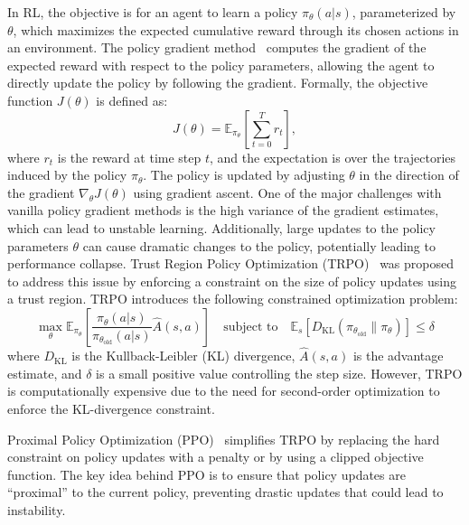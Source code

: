 In RL, the objective is for an agent to learn a policy $\pi_\theta(a|s)$, parameterized by $\theta$, which maximizes the expected cumulative reward through its chosen actions in an environment. The policy gradient method~\cite{sutton1999policy} computes the gradient of the expected reward with respect to the policy parameters, allowing the agent to directly update the policy by following the gradient. Formally, the objective function $J(\theta)$ is defined as:
%
\[
J(\theta) = \mathbb{E}_{\pi_\theta} \left[ \sum_{t=0}^{T} r_t \right],
\]
%
where $r_t$ is the reward at time step $t$, and the expectation is over the trajectories induced by the policy $\pi_\theta$. The policy is updated by adjusting $\theta$ in the direction of the gradient $\nabla_\theta J(\theta)$ using gradient ascent. One of the major challenges with vanilla policy gradient methods is the high variance of the gradient estimates, which can lead to unstable learning. Additionally, large updates to the policy parameters $\theta$ can cause dramatic changes to the policy, potentially leading to performance collapse. 
%
Trust Region Policy Optimization (TRPO)~\cite{schulman2015trpo} was proposed to address this issue by enforcing a constraint on the size of policy updates using a trust region.
%
TRPO introduces the following constrained optimization problem:
%
{\small
\[
 \max_\theta \mathbb{E}_{\pi_\theta} \left[ \frac{\pi_\theta(a|s)}{\pi_{\theta_\text{old}}(a|s)} \hat{A}(s,a) \right] 
 \quad \mbox{subject to} \quad \mathbb{E}_{s} \left[ D_{\text{KL}} \left( \pi_{\theta_\text{old}} \| \pi_\theta \right) \right] \leq \delta
\]
}
%   
where $D_{\text{KL}}$ is the Kullback-Leibler (KL) divergence, $\hat{A}(s,a)$ is the advantage estimate, and $\delta$ is a small positive value controlling the step size. However, TRPO is computationally expensive due to the need for second-order optimization to enforce the KL-divergence constraint.

Proximal Policy Optimization (PPO)~\cite{schulman2017ppo} simplifies TRPO by replacing the hard constraint on policy updates with a penalty or by using a clipped objective function. The key idea behind PPO is to ensure that policy updates are ``proximal'' to the current policy, preventing drastic updates that could lead to instability. 

